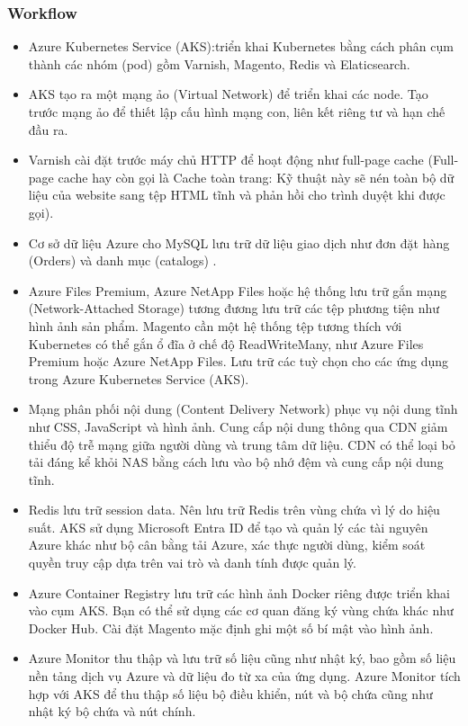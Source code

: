 \subsubsection{Workflow}
    \begin{itemize}
        \item Azure Kubernetes Service (AKS):triển khai Kubernetes bằng cách phân cụm thành các nhóm (pod) gồm Varnish, Magento, Redis và Elaticsearch.
        \item AKS tạo ra một mạng ảo (Virtual Network) để triển khai các node. Tạo trước mạng ảo để thiết lập cấu hình mạng con, liên kết riêng tư và hạn chế đầu ra. 
        \item Varnish cài đặt trước máy chủ HTTP để hoạt động như full-page cache (Full-page cache hay còn gọi là Cache toàn trang: Kỹ thuật này sẽ nén toàn bộ dữ liệu của website sang tệp HTML tĩnh và phản hồi cho trình duyệt khi được gọi).
        \item Cơ sở dữ liệu Azure cho MySQL lưu trữ dữ liệu giao dịch như đơn đặt hàng (Orders) và danh mục (catalogs) .
        \item Azure Files Premium, Azure NetApp Files hoặc hệ thống lưu trữ gắn mạng (Network-Attached Storage) tương đương lưu trữ các tệp phương tiện như hình ảnh sản phẩm. Magento cần một hệ thống tệp tương thích với Kubernetes có thể gắn ổ đĩa ở chế độ ReadWriteMany, như Azure Files Premium hoặc Azure NetApp Files. Lưu trữ các tuỳ chọn cho các ứng dụng trong Azure Kubernetes Service (AKS).
        \item Mạng phân phối nội dung (Content Delivery Network) phục vụ nội dung tĩnh như CSS, JavaScript và hình ảnh. Cung cấp nội dung thông qua CDN giảm thiểu độ trễ mạng giữa người dùng và trung tâm dữ liệu. CDN có thể loại bỏ tải đáng kể khỏi NAS bằng cách lưu vào bộ nhớ đệm và cung cấp nội dung tĩnh. 
        \item Redis lưu trữ session data. Nên lưu trữ Redis trên vùng chứa vì lý do hiệu suất. AKS sử dụng  Microsoft Entra ID để tạo và quản lý các tài nguyên Azure khác như bộ cân bằng tải Azure, xác thực người dùng, kiểm soát quyền truy cập dựa trên vai trò và danh tính được quản lý. 
        \item Azure Container Registry lưu trữ các hình ảnh Docker riêng được triển khai vào cụm AKS. Bạn có thể sử dụng các cơ quan đăng ký vùng chứa khác như Docker Hub. Cài đặt Magento mặc định ghi một số bí mật vào hình ảnh. 
        \item Azure Monitor thu thập và lưu trữ số liệu cũng như nhật ký, bao gồm số liệu nền tảng dịch vụ Azure và dữ liệu đo từ xa của ứng dụng. Azure Monitor tích hợp với AKS để thu thập số liệu bộ điều khiển, nút và bộ chứa cũng như nhật ký bộ chứa và nút chính.   
    \end{itemize}
